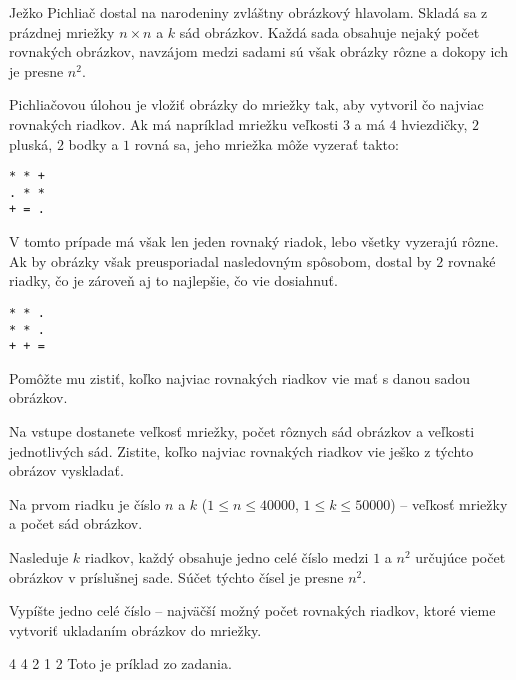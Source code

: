 





Ježko Pichliač dostal na narodeniny zvláštny obrázkový hlavolam. Skladá sa z prázdnej mriežky
$n\times n$ a $k$ sád obrázkov. Každá sada obsahuje nejaký počet rovnakých obrázkov, navzájom medzi
sadami sú však obrázky rôzne a dokopy ich je presne $n^2$.

Pichliačovou úlohou je vložiť obrázky do mriežky tak, aby vytvoril čo najviac rovnakých riadkov. Ak
má napríklad mriežku veľkosti $3$ a má $4$ hviezdičky, $2$ pluská, $2$ bodky a $1$ rovná sa, jeho
mriežka môže vyzerať takto:

\begin{verbatim}
* * +
. * *
+ = .
\end{verbatim}

V tomto prípade má však len jeden rovnaký riadok, lebo všetky vyzerajú rôzne. Ak by obrázky však
preusporiadal nasledovným spôsobom, dostal by $2$ rovnaké riadky, čo je zároveň aj to najlepšie, čo vie
dosiahnuť.

\begin{verbatim}
* * .
* * .
+ + =
\end{verbatim}

Pomôžte mu zistiť, koľko najviac rovnakých riadkov vie mať s danou sadou obrázkov.


Na vstupe dostanete veľkosť mriežky, počet rôznych sád obrázkov a veľkosti jednotlivých sád. Zistite,
koľko najviac rovnakých riadkov vie ješko z týchto obrázov vyskladať.


Na prvom riadku je číslo $n$ a $k$ ($1\leq n \leq 40000$, $1 \leq k \leq 50000$) -- veľkosť mriežky
a počet sád obrázkov.

Nasleduje $k$ riadkov, každý obsahuje jedno celé číslo medzi $1$ a $n^2$ určujúce počet obrázkov v
príslušnej sade. Súčet týchto čísel je presne $n^2$.


Vypíšte jedno celé číslo -- najväčší možný počet rovnakých riadkov, ktoré vieme vytvoriť ukladaním
obrázkov do mriežky.


 4
4
2
1
2
\komentar
Toto je príklad zo zadania.
\koniec


